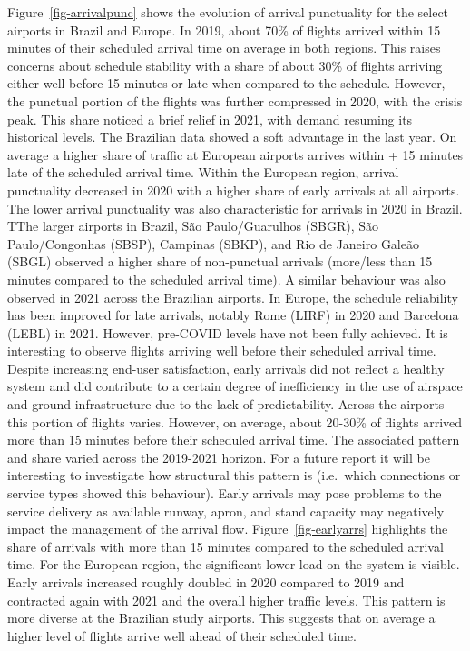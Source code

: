 \documentclass[
  a4paper,
  DIV=11,
  numbers=noendperiod]{scrreprt}
\begin{document}
Figure~\ref{fig-arrivalpunc} shows the evolution of arrival punctuality
for the select airports in Brazil and Europe. In 2019, about 70\% of
flights arrived within 15 minutes of their scheduled arrival time on
average in both regions. This raises concerns about schedule stability
with a share of about 30\% of flights arriving either well before 15
minutes or late when compared to the schedule. However, the punctual
portion of the flights was further compressed in 2020, with the crisis
peak. This share noticed a brief relief in 2021, with demand resuming
its historical levels. The Brazilian data showed a soft advantage in the
last year. On average a higher share of traffic at European airports
arrives within + 15 minutes late of the scheduled arrival time. Within
the European region, arrival punctuality decreased in 2020 with a higher
share of early arrivals at all airports. The lower arrival punctuality
was also characteristic for arrivals in 2020 in Brazil. TThe larger
airports in Brazil, São Paulo/Guarulhos (SBGR), São Paulo/Congonhas
(SBSP), Campinas (SBKP), and Rio de Janeiro Galeão (SBGL) observed a
higher share of non-punctual arrivals (more/less than 15 minutes
compared to the scheduled arrival time). A similar behaviour was also
observed in 2021 across the Brazilian airports. In Europe, the schedule
reliability has been improved for late arrivals, notably Rome (LIRF) in
2020 and Barcelona (LEBL) in 2021. However, pre-COVID levels have not
been fully achieved. It is interesting to observe flights arriving well
before their scheduled arrival time. Despite increasing end-user
satisfaction, early arrivals did not reflect a healthy system and did
contribute to a certain degree of inefficiency in the use of airspace
and ground infrastructure due to the lack of predictability. Across the
airports this portion of flights varies. However, on average, about
20-30\% of flights arrived more than 15 minutes before their scheduled
arrival time. The associated pattern and share varied across the
2019-2021 horizon. For a future report it will be interesting to
investigate how structural this pattern is (i.e.~which connections or
service types showed this behaviour). Early arrivals may pose problems
to the service delivery as available runway, apron, and stand capacity
may negatively impact the management of the arrival flow.
Figure~\ref{fig-earlyarrs} highlights the share of arrivals with more
than 15 minutes compared to the scheduled arrival time. For the European
region, the significant lower load on the system is visible. Early
arrivals increased roughly doubled in 2020 compared to 2019 and
contracted again with 2021 and the overall higher traffic levels. This
pattern is more diverse at the Brazilian study airports. This suggests
that on average a higher level of flights arrive well ahead of their
scheduled time.
\end{document}
